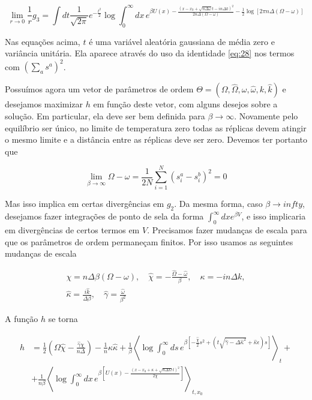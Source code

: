 \begin{equation}
  \label{eq:47}
  \lim_{r\to 0} \frac{1}{r} g_3 = \int dt \frac{1}{\sqrt{2\pi}}
  e^{-\frac{t^2}{2}} \log \int_0^\infty dx \, e^{\beta U(x) -
    \frac{\left(x-x_0 + \sqrt{n\Delta \omega} t - i n \Delta
        k\right)^2}{2n\Delta(\Omega - \omega)} - \frac{1}{2} \log[2\pi
    n \Delta(\Omega - \omega)]}
\end{equation}

Nas equações acima, $t$ é uma variável aleatória gaussiana de média
zero e variância unitária. Ela aparece através do uso da identidade
\eqref{eq:28} nos termos com $\left(\sum_a s^a\right)^2$.

Possuímos agora um vetor de parâmetros de ordem $\Theta = (\Omega,
\hat{\Omega}, \omega, \hat{\omega}, k, \hat{k})$ e desejamos maximizar
$h$ em função deste vetor, com alguns desejos sobre a solução. Em
particular, ela deve ser bem definida para $\beta \to
\infty$. Novamente pelo equilíbrio ser único, no limite de temperatura
zero todas as réplicas devem atingir o mesmo limite e a distância
entre as réplicas deve ser zero. Devemos ter portanto que

\begin{equation}
  \lim_{\beta\to \infty} \Omega - \omega = \frac{1}{2N} \sum_{i=1}^N \left(s_i^a - s_i^b \right)^2 = 0
\end{equation}

Mas isso implica em certas divergências em $g_2$. Da mesma forma, caso
$\beta \to infty$, desejamos fazer integrações de ponto de sela da
forma $\int_0^\infty dx e^{\beta V}$, e isso implicaria em
divergências de certos termos em $V$. Precisamos fazer mudanças de
escala para que os parâmetros de ordem permaneçam finitos. Por isso
usamos as seguintes mudanças de escala

\begin{align}
  \label{eq:anzats}
  \chi = n \Delta \beta (\Omega - \omega), \quad \hat{\chi} = -\frac{\hat{\Omega} - \hat{\omega}}{\beta}, \quad \kappa = -in\Delta k, \\
  \hat{\kappa} = \frac{i\hat{k}}{\Delta \beta}, \quad \hat{\gamma} = \frac{\hat{\omega}}{\beta^2}
\end{align}

A função $h$ se torna

\begin{align}
  \label{eq:h}
  h &= \frac{1}{2} \left(\Omega \hat{\chi} - \frac{\hat{\gamma}
      \chi}{n \Delta} \right) - \frac{1}{n} \kappa \hat{\kappa} +
  \frac{1}{\beta} \left\langle \log \int_0^\infty ds \,
  e^{\beta \left[-\frac{\hat{\chi}}{2}s^2 + (t \sqrt{\hat{\gamma} - \Delta
      \hat{\kappa}^2} + \hat{\kappa}\epsilon) s\right]}
\right\rangle_t + \nonumber \\ &+
\frac{1}{n\beta}\left\langle \log \int_0^\infty dx \, e^{\beta \left[ U(x) - \frac{(x - x_0 + \kappa +
      \sqrt{n\Delta\Omega}t)^2}{2\chi}\right]} \right\rangle_{t,x_0}
\end{align}

